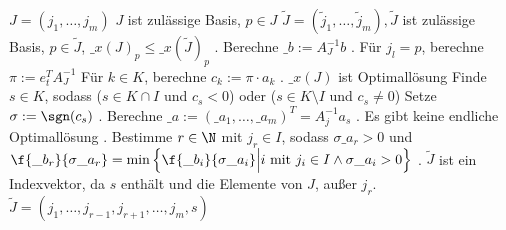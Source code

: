 \documentclass{mycourse}
\begin{document}
\begin{alg}[Simplexschritt]
	\begin{algorithmic}	
		\Input $J=(j_1,\dotsc, j_m)$
		\Assume $J$ ist zulässige Basis, $p\in J$
		\Output $\tilde J = (\tilde j_1,\dotsc,\tilde j_m), \tilde J$ ist zulässige Basis, $p\in \tilde J$, $\_x(J)_p \le \_x(\tilde J)_p$
		\Statex
		.
		\State Berechne $\_b := A_J^{-1} b$
		.
		\State Für $j_l = p$, berechne $\pi := e_t^TA_J^{-1}$
		\State Für $k\in K$, berechne $c_k := \pi\cdot a_k$
		.
			\State $\_x(J)$ ist Optimallösung
		\Else
			\State Finde $s\in K$, sodass ($s\in K\cap I$ und $c_s<0$) oder ($s\in K\setminus I$ und $c_s\neq 0$)
			\State Setze $\sigma := \sgn(c_s)$
			.
			\State Berechne $\_a := (\_a_1, \dotsc, \_a_m)^T = A_j^{-1}a_s$
			.
				\State Es gibt keine endliche Optimallösung
			\Else
				.
				\State Bestimme $r\in \N$ mit $j_r\in I$, sodass $\sigma \_a_r > 0$ und $\f{\_b_r}{\sigma \_a_r} = \min\left\{\f{\_b_i}{\sigma \_a_i} \Big| i \text{ mit } j_i\in I \land \sigma \_a_i > 0\right\}$
				.
				\State $\tilde J$ ist ein Indexvektor, da $s$ enthält und die Elemente von $J$, außer $j_r$.
				\State $\tilde J = (j_1,\dotsc, j_{r-1},j_{r+1},\dotsc,j_m,s)$
			\EndIf
		\EndIf
	\end{algorithmic}
\end{alg}
\setcounter{equation}{12}
\end{document}
